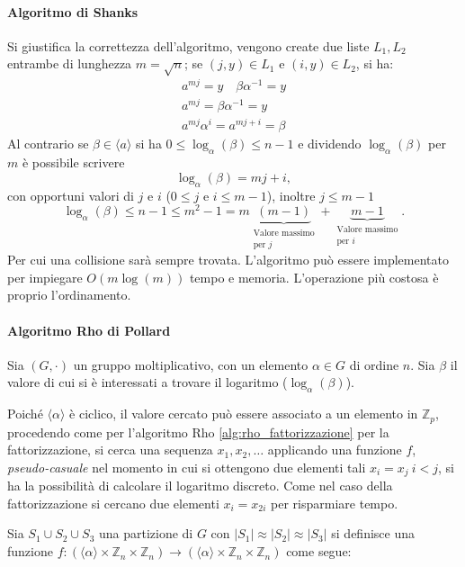 

\paragraph{Algoritmo di Shanks}
\noindent
Si giustifica la correttezza dell'algoritmo, vengono create due liste $L_1,L_2$ entrambe di lunghezza $m = \sqrt{n}$; se $(j,y) \in L_1$ e $(i,y) \in L_2$, si ha:
\begin{gather*}
    a^{mj} = y \quad \beta\alpha^{-1} = y \\
    a^{mj} =  \beta\alpha^{-1} = y\\
    a^{mj} \alpha^{i} = a^{mj+i} = \beta
\end{gather*}
Al contrario se $\beta \in \langle a \rangle$ si ha $0 \leq \log_{\alpha}(\beta) \leq n-1$ e dividendo $\log_{\alpha}(\beta)$ per $m$ è possibile scrivere 
\[
    \log_{\alpha}(\beta) = mj +i,
\]
con opportuni valori di $j$ e $i$ ($0 \leq j$ e $i \leq m-1$), inoltre $j \leq m-1$
\[
    \log_{\alpha}(\beta) \leq n - 1 \leq m^2 - 1 = m\underbrace{(m-1)}_{
    \substack{\text{Valore massimo} \\ \text{per $j$}}} + \underbrace{m -1}_{\substack{\text{Valore massimo} \\ \text{per $i$}}}.
\]
Per cui una collisione sarà sempre trovata. L'algoritmo può essere implementato per impiegare $O(m\log(m))$ tempo e memoria. L'operazione più costosa è proprio l'ordinamento. 

\paragraph{Algoritmo Rho di Pollard}
Sia $(G, \cdot )$ un gruppo moltiplicativo, con un elemento $\alpha \in G$ di ordine $n$. Sia $\beta$ il valore di cui si è interessati a trovare il logaritmo ($\log_{\alpha}(\beta)$).

Poiché $\langle \alpha \rangle$ è ciclico, il valore cercato può essere associato a un elemento in $\mathbb{Z}_p$, procedendo come per l'algoritmo Rho \ref{alg:rho_fattorizzazione} per la fattorizzazione, si cerca una sequenza $x_1,x_2,\dots$ applicando una funzione $f$, \emph{pseudo-casuale} nel momento in cui si ottengono due elementi tali $x_i =x_j \ i < j$, si ha la possibilità di calcolare il logaritmo discreto. Come nel caso della fattorizzazione si cercano due elementi $x_i = x_{2i}$ per risparmiare tempo.

\vspace{1em}\noindent
Sia $S_1 \cup S_2 \cup S_3$ una partizione di $G$ con $|S_1| \approx |S_2| \approx |S_3|$ si definisce una funzione $f: \left(\langle \alpha \rangle \times \mathbb{Z}_n \times \mathbb{Z}_n\right) \to \left(\langle \alpha \rangle \times \mathbb{Z}_n \times \mathbb{Z}_n\right)$ come segue:

